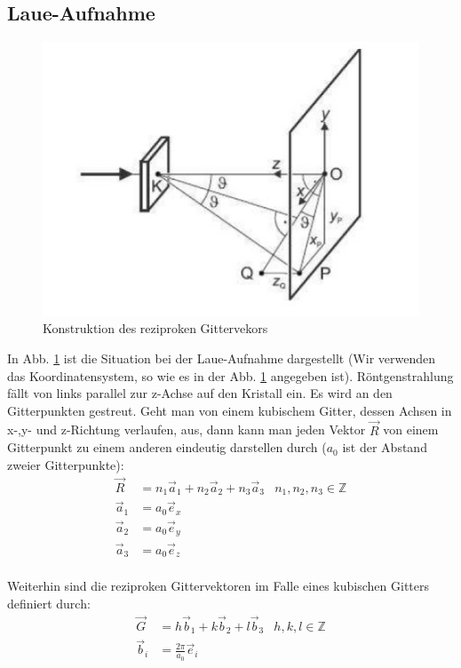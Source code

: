 \subsection{Laue-Aufnahme}
\begin{figure}
\centering
\includegraphics[scale=0.5]{data/laue/th_laue.png}
\caption{Konstruktion des reziproken Gittervekors\cite{praktikumsheft}}
\label{fig:laue_th}
\end{figure}

In Abb. \ref{fig:laue_th} ist die Situation bei der Laue-Aufnahme dargestellt (Wir verwenden das Koordinatensystem, so wie es in der Abb. \ref{fig:laue_th} angegeben ist). Röntgenstrahlung fällt von links parallel zur z-Achse auf den Kristall ein. Es wird an den Gitterpunkten gestreut. Geht man von einem kubischem Gitter, dessen Achsen in x-,y- und z-Richtung verlaufen, aus, dann kann man jeden Vektor $\vec{R}$ von einem Gitterpunkt zu einem anderen eindeutig darstellen durch ($a_0$ ist der Abstand zweier Gitterpunkte):
\begin{align*}
\vec{R} &= n_1\vec{a}_1 + n_2\vec{a}_2 + n_3\vec{a}_3 & n_1,n_2,n_3 \in \mathbb{Z}\\
	\vec{a}_1 &= a_0\vec{e}_x\\
	\vec{a}_2 &= a_0\vec{e}_y\\
	\vec{a}_3 &= a_0\vec{e}_z\\ 
\end{align*}

Weiterhin sind die reziproken Gittervektoren im Falle eines kubischen Gitters definiert durch:
\begin{align*}
\vec{G} &= h\vec{b}_1 + k\vec{b}_2 + l\vec{b}_3 & h,k,l \in \mathbb{Z}\\
\vec{b}_i &= \frac{2\pi}{a_0} \vec{e}_i
\end{align*}

